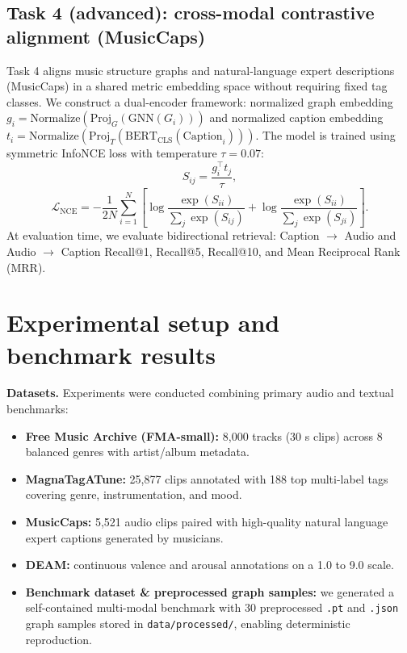 \documentclass[10pt]{article}
\begin{document}
\subsection{Task 4 (advanced): cross-modal contrastive alignment (MusicCaps)}

Task 4 aligns music structure graphs and natural-language expert descriptions (MusicCaps) in a shared metric embedding space without requiring fixed tag classes. We construct a dual-encoder framework: normalized graph embedding $g_i = \text{Normalize}(\text{Proj}_G(\text{GNN}(G_i)))$ and normalized caption embedding $t_i = \text{Normalize}(\text{Proj}_T(\text{BERT}_{\text{CLS}}(\text{Caption}_i)))$. The model is trained using symmetric InfoNCE loss with temperature $\tau = 0.07$:
\begin{equation}
  S_{ij} = \frac{g_i^{\top} t_j}{\tau},
\end{equation}
\begin{equation}
  \mathcal{L}_{\text{NCE}} = -\frac{1}{2N}\sum_{i=1}^{N}\left[ \log\frac{\exp(S_{ii})}{\sum_j \exp(S_{ij})} + \log\frac{\exp(S_{ii})}{\sum_j \exp(S_{ji})} \right].
\end{equation}
At evaluation time, we evaluate bidirectional retrieval: Caption $\rightarrow$ Audio and Audio $\rightarrow$ Caption Recall@1, Recall@5, Recall@10, and Mean Reciprocal Rank (MRR).

\section{Experimental setup and benchmark results}

\textbf{Datasets.} Experiments were conducted combining primary audio and textual benchmarks:
\begin{itemize}[nosep]
  \item \textbf{Free Music Archive (FMA-small):} 8{,}000 tracks (30 s clips) across 8 balanced genres with artist/album metadata.
  \item \textbf{MagnaTagATune:} 25{,}877 clips annotated with 188 top multi-label tags covering genre, instrumentation, and mood.
  \item \textbf{MusicCaps:} 5{,}521 audio clips paired with high-quality natural language expert captions generated by musicians.
  \item \textbf{DEAM:} continuous valence and arousal annotations on a 1.0 to 9.0 scale.
  \item \textbf{Benchmark dataset \& preprocessed graph samples:} we generated a self-contained multi-modal benchmark with 30 preprocessed \texttt{.pt} and \texttt{.json} graph samples stored in \texttt{data/processed/}, enabling deterministic reproduction.
\end{itemize}
\end{document}
